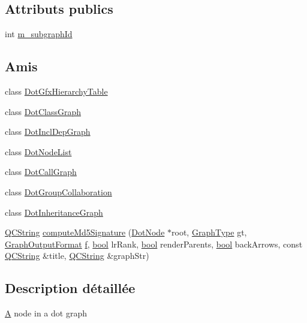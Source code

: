 \subsection*{Attributs publics}
\begin{DoxyCompactItemize}
\item 
int \hyperlink{class_dot_node_afa257c0a638d14c60ba4714df5a9845b}{m\+\_\+subgraph\+Id}
\end{DoxyCompactItemize}
\subsection*{Amis}
\begin{DoxyCompactItemize}
\item 
class \hyperlink{class_dot_node_a17f4bf1cb76060fb23b5d2e4d49a578c}{Dot\+Gfx\+Hierarchy\+Table}
\item 
class \hyperlink{class_dot_node_aa0285f25f08e09a51d2d402e2f7f697f}{Dot\+Class\+Graph}
\item 
class \hyperlink{class_dot_node_af4dd0198d517a07b979a10cb13a77148}{Dot\+Incl\+Dep\+Graph}
\item 
class \hyperlink{class_dot_node_a8782e47c20d8314fd3b24f1dc3fe081a}{Dot\+Node\+List}
\item 
class \hyperlink{class_dot_node_a6dc1c2df4e772dc9740f210dc2a7e522}{Dot\+Call\+Graph}
\item 
class \hyperlink{class_dot_node_a32f81573a55b09d3b8f7d8b7ce6b2fbf}{Dot\+Group\+Collaboration}
\item 
class \hyperlink{class_dot_node_afe8663d3231ffb700d56ef6eedb99208}{Dot\+Inheritance\+Graph}
\item 
\hyperlink{class_q_c_string}{Q\+C\+String} \hyperlink{class_dot_node_a884f8a9fb5f3d91efe1b967011f8f98c}{compute\+Md5\+Signature} (\hyperlink{class_dot_node}{Dot\+Node} $\ast$root, \hyperlink{class_dot_node_ac4e8b27d54919cd0afa73f4c8c7d569c}{Graph\+Type} gt, \hyperlink{dot_8h_ac60ef98d62b78366a17c9f1bda96523f}{Graph\+Output\+Format} \hyperlink{060__command__switch_8tcl_af6830d2c644b45088ea8f1f74a46b778}{f}, \hyperlink{qglobal_8h_a1062901a7428fdd9c7f180f5e01ea056}{bool} lr\+Rank, \hyperlink{qglobal_8h_a1062901a7428fdd9c7f180f5e01ea056}{bool} render\+Parents, \hyperlink{qglobal_8h_a1062901a7428fdd9c7f180f5e01ea056}{bool} back\+Arrows, const \hyperlink{class_q_c_string}{Q\+C\+String} \&title, \hyperlink{class_q_c_string}{Q\+C\+String} \&graph\+Str)
\end{DoxyCompactItemize}


\subsection{Description détaillée}
\hyperlink{class_a}{A} node in a dot graph 

